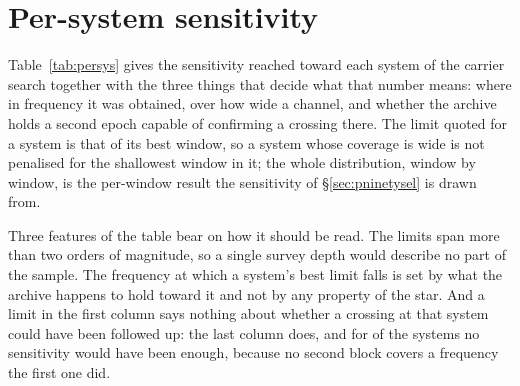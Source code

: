 \section{Per-system sensitivity}
\label{app:persys}

Table~\ref{tab:persys} gives the sensitivity reached toward each system of the
carrier search together with the three things that decide what that number
means: where in frequency it was obtained, over how wide a channel, and
whether the archive holds a second epoch capable of confirming a crossing
there. The limit quoted for a system is that of its best window, so a system
whose coverage is wide is not penalised for the shallowest window in it; the
whole distribution, window by window, is the per-window result the sensitivity
of \S\ref{sec:pninetysel} is drawn from.

Three features of the table bear on how it should be read. The limits span
more than two orders of magnitude, so a single survey depth would describe no
part of the sample. The frequency at which a system's best limit falls is set
by what the archive happens to hold toward it and not by any property of the
star. And a limit in the first column says nothing about whether a crossing at
that system could have been followed up: the last column does, and for
\RcNoRepSys{} of the \NSysClassA{} systems no sensitivity would have been
enough, because no second block covers a frequency the first one did.

\begin{table}
\centering
\caption{\textbf{Per-system sensitivity of the carrier search.} For each of
the \NSysClassA{} systems the fine-channel search covers, the
$\mathrm{EIRP}_{90}$ of its best window --- the equivalent isotropic radiated
power at which nine injected carriers in ten are recovered, $\EirpNinetyMultA
\,P_{\rm trig}$ with that window's own annual-parallax and smearing retention
applied --- with that window's centre frequency $\nu$ and native channel width
$\Delta\nu$, and the system's merged frequency coverage $\Delta\nu_{\rm cov}$.
Rows are ordered by the limit, which spans
$\EirpNinetySysLoA$--$\EirpNinetySysHiA$\,W; the median system is covered over
\SysUnionAMed\,GHz, and channel widths across the search run from \ChanLoA{}
to \ChanHiA\,kHz. The last column records whether two execution blocks cover a
common frequency more than one day apart (d) or more than a year apart (yr):
\RcConfSysDay{} systems reach the first and \RcConfSysYr{} the second, and
these are lower bounds, since two blocks can be shown to be separated but
never shown to be simultaneous. For the remaining \RcNoRepSys{} systems a
crossing could not have been confirmed at any sensitivity. A gravitationally
bound pair is one system and takes its primary's name.}
\label{tab:persys}
\footnotesize

\end{table}
